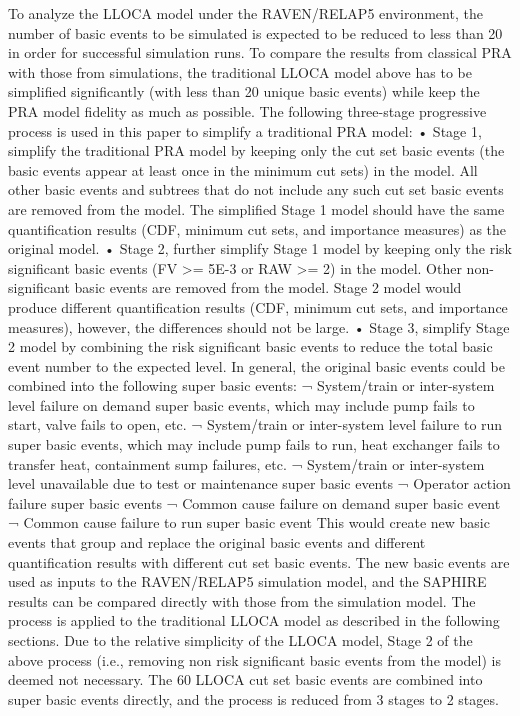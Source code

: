 To analyze the LLOCA model under the RAVEN/RELAP5 environment, the number of basic events to be simulated is expected to be reduced to less than 20 in order for successful simulation runs. To compare the results from classical PRA with those from simulations, the traditional LLOCA model above has to be simplified significantly (with less than 20 unique basic events) while keep the PRA model fidelity as much as possible.
The following three-stage progressive process is used in this paper to simplify a traditional PRA model:
•	Stage 1, simplify the traditional PRA model by keeping only the cut set basic events (the basic events appear at least once in the minimum cut sets) in the model. All other basic events and subtrees that do not include any such cut set basic events are removed from the model. The simplified Stage 1 model should have the same quantification results (CDF, minimum cut sets, and importance measures) as the original model.
•	Stage 2, further simplify Stage 1 model by keeping only the risk significant basic events (FV >= 5E-3 or RAW >= 2) in the model. Other non-significant basic events are removed from the model. Stage 2 model would produce different quantification results (CDF, minimum cut sets, and importance measures), however, the differences should not be large.
•	Stage 3, simplify Stage 2 model by combining the risk significant basic events to reduce the total basic event number to the expected level. In general, the original basic events could be combined into the following super basic events:
¬	System/train or inter-system level failure on demand super basic events, which may include pump fails to start, valve fails to open, etc.
¬	System/train or inter-system level failure to run super basic events, which may include pump fails to run, heat exchanger fails to transfer heat, containment sump failures, etc.
¬	System/train or inter-system level unavailable due to test or maintenance super basic events
¬	Operator action failure super basic events
¬	Common cause failure on demand super basic event
¬	Common cause failure to run super basic event
This would create new basic events that group and replace the original basic events and different quantification results with different cut set basic events. The new basic events are used as inputs to the RAVEN/RELAP5 simulation model, and the SAPHIRE results can be compared directly with those from the simulation model. 
The process is applied to the traditional LLOCA model as described in the following sections. Due to the relative simplicity of the LLOCA model, Stage 2 of the above process (i.e., removing non risk significant basic events from the model) is deemed not necessary. The 60 LLOCA cut set basic events are combined into super basic events directly, and the process is reduced from 3 stages to 2 stages.


